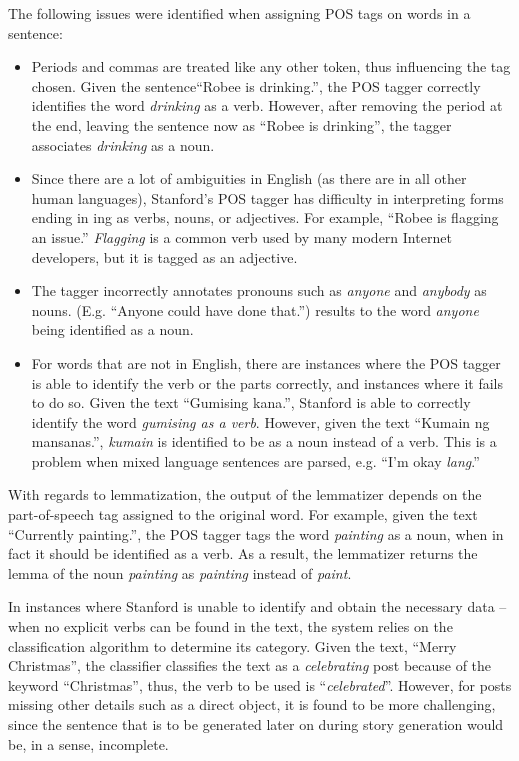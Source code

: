 The following issues were identified when assigning POS tags on words in a sentence:
\begin{itemize}
	\item Periods and commas are treated like any other token, thus influencing the tag chosen. Given the sentence``Robee is drinking.”, the POS tagger correctly identifies the word \textit{drinking} as a verb. However, after removing the period at the end, leaving the sentence now as ``Robee is drinking”, the tagger associates \textit{drinking} as a noun.
	\item Since there are a lot of ambiguities in English (as there are in all other human languages), Stanford’s POS tagger has difficulty in interpreting forms ending in ing as verbs, nouns, or adjectives. For example, ``Robee is flagging an issue.” \textit{Flagging} is a common verb used by many modern Internet developers, but it is tagged as an adjective.
	\item The tagger incorrectly annotates pronouns such as \textit{anyone} and \textit{anybody} as nouns. (E.g. ``Anyone could have done that.”) results to the word \textit{anyone} being identified as a noun.
	\item For words that are not in English, there are instances where the POS tagger is able to identify the verb or the parts correctly, and instances where it fails to do so. Given the text ``Gumising kana.”, Stanford is able to correctly identify the word \textit{gumising as a verb}. However, given the text ``Kumain ng mansanas.”, \textit{kumain} is identified to be as a noun instead of a verb. This is a problem when mixed language sentences are parsed, e.g. ``I’m okay \textit{lang}.”
\end{itemize}

With regards to lemmatization, the output of the lemmatizer depends on the part-of-speech tag assigned to the original word. For example, given the text ``Currently painting.”, the POS tagger tags the word \textit{painting} as a noun, when in fact it should be identified as a verb. As a result, the lemmatizer returns the lemma of the noun \textit{painting} as \textit{painting} instead of \textit{paint}.

In instances where Stanford is unable to identify and obtain the necessary data -- when no explicit verbs can be found in the text, the system relies on the classification algorithm to determine its category. Given the text, ``Merry Christmas”, the classifier classifies the text as a \textit{celebrating} post because of the keyword ``Christmas”, thus, the verb to be used is ``\textit{celebrated}”. However, for posts missing other details such as a direct object, it is found to be more challenging, since the sentence that is to be generated later on during story generation would be, in a sense, incomplete.
 
